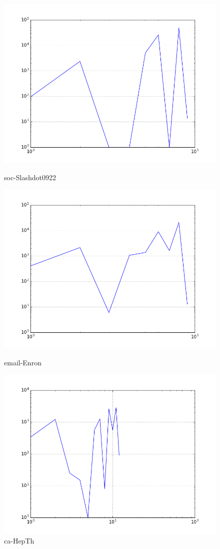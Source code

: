 \begin{figure}[H]
  \includegraphics[width=\linewidth]{img/slashDot09/radius_dist.png}
  \caption*{soc-Slashdot0922}
\endminipage\hfill
{}
  \includegraphics[width=\linewidth]{img/email/radius_dist.png}
  \caption*{email-Enron}
\endminipage\hfill
{}
  \includegraphics[width=\linewidth]{img/ca-HepTh/radius_dist.png}
  \caption*{ca-HepTh}
\endminipage
\end{figure}
